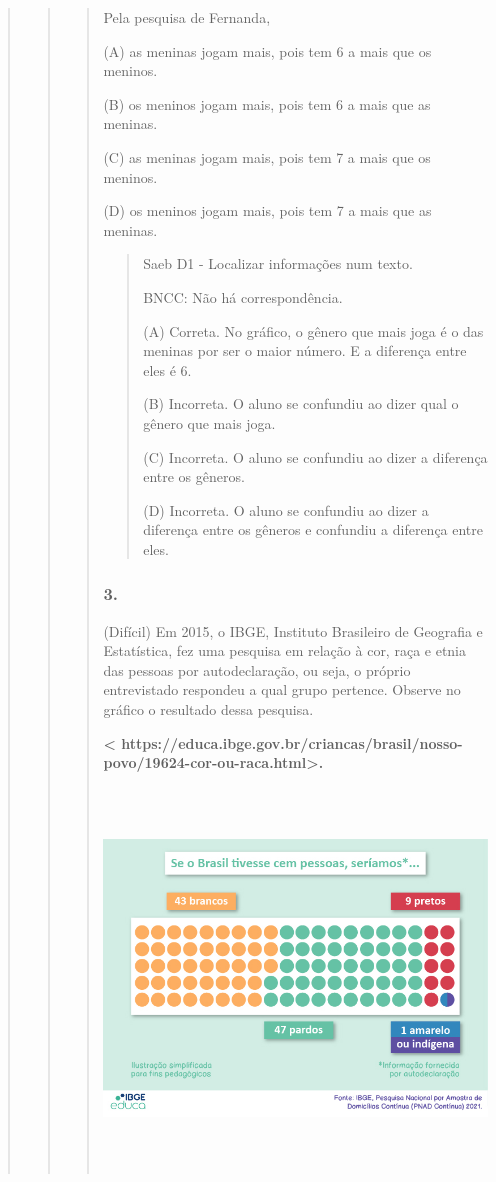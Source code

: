 \begin{quote}
\begin{quote}
\begin{quote}
Pela pesquisa de Fernanda,

(A) as meninas jogam mais, pois tem 6 a mais que os meninos.

(B) os meninos jogam mais, pois tem 6 a mais que as meninas.

(C) as meninas jogam mais, pois tem 7 a mais que os meninos.

(D) os meninos jogam mais, pois tem 7 a mais que as meninas.

\begin{quote}
Saeb D1 - Localizar informações num texto.

BNCC: Não há correspondência.

(A) Correta. No gráfico, o gênero que mais joga é o das meninas por ser
o maior número. E a diferença entre eles é 6.

(B) Incorreta. O aluno se confundiu ao dizer qual o gênero que mais
joga.

(C) Incorreta. O aluno se confundiu ao dizer a diferença entre os
gêneros.

(D) Incorreta. O aluno se confundiu ao dizer a diferença entre os
gêneros e confundiu a diferença entre eles.
\end{quote}

\subsubsection{3. }\label{section-70}

(Difícil) Em 2015, o IBGE, Instituto Brasileiro de Geografia e
Estatística, fez uma pesquisa em relação à cor, raça e etnia das pessoas
por autodeclaração, ou seja, o próprio entrevistado respondeu a qual
grupo pertence. Observe no gráfico o resultado dessa pesquisa.

\textbf{\textless{}
https://educa.ibge.gov.br/criancas/brasil/nosso-povo/19624-cor-ou-raca.html\textgreater{}.
}

\includegraphics[width=5.51042in,height=3.98702in]{media/image32.jpeg}


\end{quote}
\end{quote}
\end{quote}
